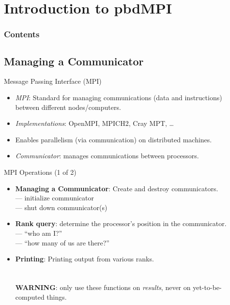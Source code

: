 \section[pbdMPI]{Introduction to pbdMPI}

\hidenum
\begin{frame}[noframenumbering]
\frametitle{Contents}
 \tableofcontents[currentsection,hideothersubsections,sectionstyle=show/hide]
\end{frame}
\shownum

\subsection{Managing a Communicator}

\begin{frame}
  \begin{block}{Message Passing Interface (MPI)}\pause
    \begin{itemize}
      \item \textit{MPI}: Standard for managing communications (data and instructions) between different nodes/computers.
      \item \textit{Implementations}:  OpenMPI, MPICH2, Cray MPT, \dots
      \item Enables parallelism (via communication) on distributed machines.
      \item \textit{Communicator}: manages communications between processors.
    \end{itemize}
  \end{block}
\end{frame}


\begin{frame}
  \begin{block}{MPI Operations (1 of 2)}\pause
    \begin{itemize}
      \item \textbf{Managing a Communicator}:  Create and destroy communicators.\\
       --- initialize communicator\\
       --- shut down communicator(s)
      \\[.4cm]
      \item \textbf{Rank query}: determine the processor's position in the communicator.\\
       --- ``who am I?''\\
       --- ``how many of us are there?''\\[.4cm]
      \item \textbf{Printing}:  Printing output from various ranks.\\
      \\
      \\
      \textbf{WARNING}: only use these functions on \emph{results}, never on yet-to-be-computed things.\\
    \end{itemize}
  \end{block}
\end{frame}


